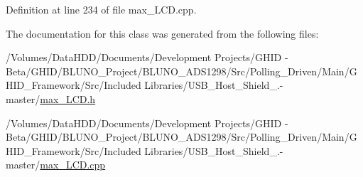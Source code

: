 \-Definition at line 234 of file max\-\_\-\-L\-C\-D.\-cpp.



\-The documentation for this class was generated from the following files\-:\begin{DoxyCompactItemize}
\item 
/\-Volumes/\-Data\-H\-D\-D/\-Documents/\-Development Projects/\-G\-H\-I\-D -\/ Beta/\-G\-H\-I\-D/\-B\-L\-U\-N\-O\-\_\-\-Project/\-B\-L\-U\-N\-O\-\_\-\-A\-D\-S1298/\-Src/\-Polling\-\_\-\-Driven/\-Main/\-G\-H\-I\-D\-\_\-\-Framework/\-Src/\-Included Libraries/\-U\-S\-B\-\_\-\-Host\-\_\-\-Shield\-\_.-\/master/\hyperlink{max___l_c_d_8h}{max\-\_\-\-L\-C\-D.\-h}\item 
/\-Volumes/\-Data\-H\-D\-D/\-Documents/\-Development Projects/\-G\-H\-I\-D -\/ Beta/\-G\-H\-I\-D/\-B\-L\-U\-N\-O\-\_\-\-Project/\-B\-L\-U\-N\-O\-\_\-\-A\-D\-S1298/\-Src/\-Polling\-\_\-\-Driven/\-Main/\-G\-H\-I\-D\-\_\-\-Framework/\-Src/\-Included Libraries/\-U\-S\-B\-\_\-\-Host\-\_\-\-Shield\-\_.-\/master/\hyperlink{max___l_c_d_8cpp}{max\-\_\-\-L\-C\-D.\-cpp}\end{DoxyCompactItemize}
